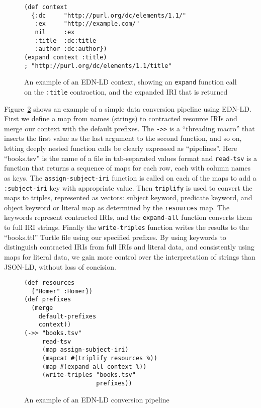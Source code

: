 \documentclass{icbo}
\begin{document}
\begin{figure}
\begin{verbatim}
(def context
  {:dc     "http://purl.org/dc/elements/1.1/"
   :ex     "http://example.com/"
   nil     :ex
   :title  :dc:title
   :author :dc:author})
(expand context :title)
; "http://purl.org/dc/elements/1.1/title"
\end{verbatim}
\caption{An example of an EDN-LD context, showing an {\tt expand} function call on the {\tt :title} contraction, and the expanded IRI that is returned}
\label{context}
\end{figure}

Figure~\ref{example} shows an example of a simple data conversion pipeline using EDN-LD. First we define a map from names (strings) to contracted resource IRIs and merge our context with the default prefixes. The {\tt ->>} is a ``threading macro'' that inserts the first value as the last argument to the second function, and so on, letting deeply nested function calls be clearly expressed as ``pipelines''. Here ``books.tsv'' is the name of a file in tab-separated values format and {\tt read-tsv} is a function that returns a sequence of maps for each row, each with column names as keys. The {\tt assign-subject-iri} function is called on each of the maps to add a {\tt :subject-iri} key with appropriate value. Then {\tt triplify} is used to convert the maps to triples, represented as vectors: subject keyword, predicate keyword, and object keyword or literal map as determined by the {\tt resources} map. The keywords represent contracted IRIs, and the {\tt expand-all} function converts them to full IRI strings. Finally the {\tt write-triples} function writes the results to the ``books.ttl'' Turtle file using our specified prefixes. By using keywords to distinguish contracted IRIs from full IRIs and literal data, and consistently using maps for literal data, we gain more control over the interpretation of strings than JSON-LD, without loss of concision.

\begin{figure}
\begin{verbatim}
(def resources
  {"Homer" :Homer})
(def prefixes
  (merge
    default-prefixes
    context))
(->> "books.tsv"
     read-tsv
     (map assign-subject-iri)
     (mapcat #(triplify resources %))
     (map #(expand-all context %))
     (write-triples "books.tsv"
                    prefixes))
\end{verbatim}
\caption{An example of an EDN-LD conversion pipeline}
\label{example}
\end{figure}
\end{document}
